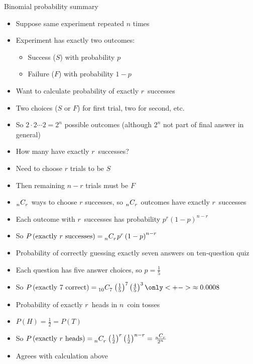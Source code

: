 \documentclass[handout,xcolor=dvipsnames]{beamer}
\theoremstyle{definition}
\newcommand\ncr[2]{\tensor[_{#1}]C{_{#2}}}
\begin{document}
\begin{frame}{Binomial probability summary}
\begin{itemize}
\item Suppose same experiment repeated $n$ times
\item Experiment has exactly two outcomes:
\begin{itemize}
\item Success ($S$) with probability $p$
\item Failure ($F$) with probability $1-p$
\end{itemize}
\item Want to calculate probability of exactly $r$~successes
\item Two choices ($S$ or $F$) for first trial, two for second, etc.
\item So $2\cdot 2\cdots 2=2^n$ possible outcomes (although $2^n$
not part of final answer in general)
\item How many have exactly $r$~successes?
\item Need to choose $r$ trials to be $S$
\item Then remaining $n-r$ trials must be $F$
\item $\ncr{n}{r}$ ways to choose $r$ successes,
so $\ncr{n}{r}$ outcomes have exactly $r$~successes
\item Each outcome with $r$~successes has probability
$p^r\left(1-p\right)^{n-r}$
\item So $P\left(\text{exactly $r$ successes}\right)
=\ncr{n}{r}p^r\left(1-p\right)^{n-r}$
\end{itemize}
\end{frame}

\begin{frame}
\begin{example}
\begin{itemize}
\item Probability of correctly guessing exactly seven answers
on ten-question quiz
\item Each question has five answer choices,
so $p=\frac{1}{5}$
\item So $P\left(\text{exactly $7$ correct}\right)
=\ncr{10}{7}\left(\frac{1}{5}\right)^7\left(\frac{4}{5}\right)^3
\only<+->{\approx 0.0008}$
\end{itemize}
\end{example}
\begin{example}
\begin{itemize}
\item Probability of exactly $r$~heads in $n$~coin tosses
\item $P\left(H\right)=\frac{1}{2}=P\left(T\right)$
\item So $P\left(\text{exactly $r$ heads}\right)
=\ncr{n}{r}\left(\frac{1}{2}\right)^r\left(\frac{1}{2}\right)^{n-r}
=\frac{\ncr{n}{r}}{2^n}$
\item Agrees with calculation above
\end{itemize}
\end{example}
\end{frame}
\end{document}
